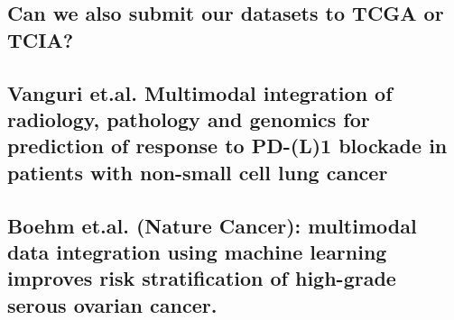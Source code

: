 \documentclass{article}%
\begin{document}
\subsection{}%
\label{subsec:}%

%
\subsection{Can we also submit our datasets to TCGA or TCIA? }%
\label{subsec:CanwealsosubmitourdatasetstoTCGAorTCIA?}%

%
\subsection{}%
\label{subsec:}%

%
\subsection{}%
\label{subsec:}%

%
\subsection{Vanguri et.al. Multimodal integration of radiology, pathology and genomics for prediction of response to PD{-}(L)1 blockade in patients with non{-}small cell lung cancer }%
\label{subsec:Vanguriet.al.Multimodalintegrationofradiology,pathologyandgenomicsforpredictionofresponsetoPD{-}(L)1blockadeinpatientswithnon{-}smallcelllungcancer}%

%
\subsection{}%
\label{subsec:}%

%
\subsection{Boehm et.al. (Nature Cancer): multimodal data integration using machine learning improves risk stratification of high{-}grade serous ovarian cancer.}%
\label{subsec:Boehmet.al.(NatureCancer)multimodaldataintegrationusingmachinelearningimprovesriskstratificationofhigh{-}gradeserousovariancancer.}%
\end{document}
